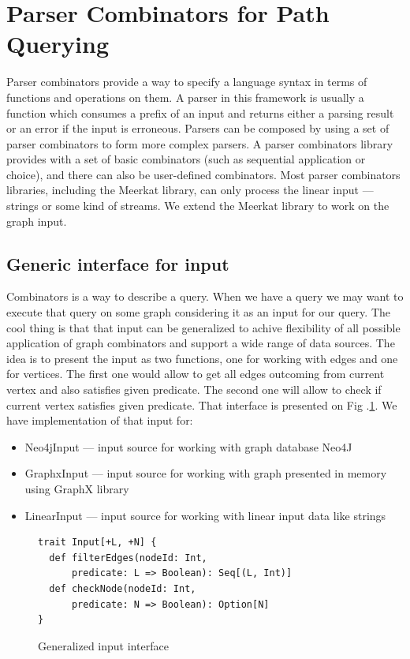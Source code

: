  \section{Parser Combinators for Path Querying}

Parser combinators provide a way to specify a language syntax in terms of functions and operations on them. 
A parser in this framework is usually a function which consumes a prefix of an input and returns either a parsing result or an error if the input is erroneous. 
Parsers can be composed by using a set of parser combinators to form more complex parsers. 
A parser combinators library provides with a set of basic combinators (such as sequential application or choice), and there can also be user-defined combinators. 
Most parser combinators libraries, including the Meerkat library, can only process the linear input --- strings or some kind of streams. 
We extend the Meerkat library to work on the graph input.


\subsection{Generic interface for input}
Combinators is a way to describe a query. When we have a query we may want to execute that query on some graph considering it as an input for our query. The cool thing is that that input can be generalized to achive flexibility of all possible application of graph combinators and support a wide range of data sources. The idea is to present the input as two functions, one for working with edges and one for vertices. The first one would allow to get all edges outcoming from current vertex and also satisfies given predicate. The second one will allow to check if current vertex satisfies given predicate. That interface is presented on Fig .\ref{fig:input}. We have implementation of that input for: 
\begin{itemize}
    \item Neo4jInput --- input source for working with graph database Neo4J
    \item GraphxInput --- input source for working with graph presented in memory using GraphX library
    \item LinearInput --- input source for working with linear input data like strings
\end{itemize}

\begin{figure}[h]
\begin{lstlisting}
trait Input[+L, +N] {
  def filterEdges(nodeId: Int, 
      predicate: L => Boolean): Seq[(L, Int)]
  def checkNode(nodeId: Int, 
      predicate: N => Boolean): Option[N]
}

\end{lstlisting}
\caption{Generalized input interface}
\label{fig:input}
\end{figure}


